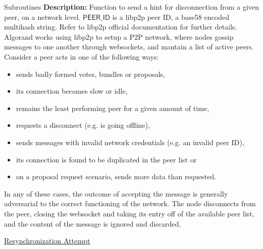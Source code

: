\documentclass[10pt,a4paper]{article}
\begin{document}
\begin{section}{Subroutines}
\noindent \textbf{Description:}
Function to send a hint for disconnection from a given peer, on a network level.
$\mathsf{PEER\_ID}$ is a libp2p peer ID, a base58 encoded multihash string.
Refer to libp2p official documentation for further details.
Algorand works using libp2p to setup a P2P network, where nodes gossip messages to one another
through websockets, and mantain a list of active peers.
Consider a peer acts in one of the following ways:
\begin{itemize}
    \item sends badly formed votes, bundles or proposals, %
    \item its connection becomes slow or idle,
    \item remains the least performing peer for a given amount of time,
    \item requests a disconnect (e.g. is going offline),
    \item sends messages with invalid network credentials (e.g. an invalid peer ID),
    \item its connection is found to be duplicated in the peer list or
    \item on a proposal request scenario, sends more data than requested.
\end{itemize}
 
In any of these cases, the outcome of accepting the message is generally adversarial
to the correct functioning of the network. The node disconnects from the peer, closing the websocket and taking
its entry off of the available peer list, and the content of the message is ignored and discarded.


\begin{algorithm}[H]
    \caption{\underline{Resynchronization Attempt}}
    \label{algo:resynchronization-attempt}
    \begin{algorithmic}[1]


\end{algorithmic}
\end{algorithm}
\end{section}
\end{document}
